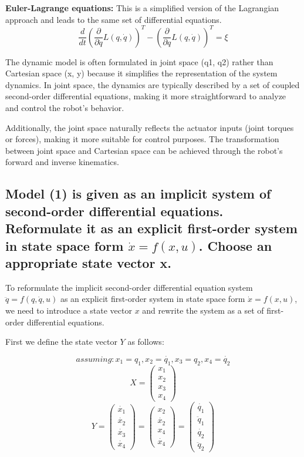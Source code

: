 \documentclass[a4paper, 12pt]{report}
\begin{document}
\textbf{Euler-Lagrange equations:} This is a simplified version of the Lagrangian approach and leads to the same set of differential equations.
$$\frac{d}{dt}\left(\frac{\partial}{\partial \dot{q}} L(q, \dot{q})\right)^T-\left(\frac{\partial}{\partial q} L(q, \dot{q})\right)^T=\xi$$

The dynamic model is often formulated in joint space (q1, q2) rather than Cartesian space (x, y) because it simplifies the representation of the system dynamics. In joint space, the dynamics are typically described by a set of coupled second-order differential equations, making it more straightforward to analyze and control the robot's behavior. 
\medskip

Additionally, the joint space naturally reflects the actuator inputs (joint torques or forces), making it more suitable for control purposes. The transformation between joint space and Cartesian space can be achieved through the robot's forward and inverse kinematics.
\medskip


\subsection{Model (1) is given as an implicit system of second-order differential equations. Reformulate it as an explicit first-order system in state space form $\dot{x} = f(x,u)$. Choose an appropriate state vector x.}

To reformulate the implicit second-order differential equation system \( \ddot{q} = f(q, \dot{q}, u) \) as an explicit first-order system in state space form \( \dot{x} = f(x, u) \), we need to introduce a state vector \( x \) and rewrite the system as a set of first-order differential equations.

First we define the state vector \(Y\) as follows:

$$assuming: x_1 = q_1, x_2 = \dot{q_1}, x_3 = q_2, x_4 = \dot{q_2}$$
\[ X  = \begin{pmatrix} x_1 \\ x_2 \\ x_3 \\ x_4 \end{pmatrix} \]
\[ Y  = \begin{pmatrix} \dot{x_1} \\ \dot{x_2} \\ \dot{x_3} \\ \dot{x_4} \end{pmatrix} = \begin{pmatrix} x_2 \\ \dot{x_2} \\ x_4 \\ \dot{x_4} \end{pmatrix} = \begin{pmatrix} \dot{q_1} \\ \ddot{q}_1 \\ \dot{q_2} \\ \ddot{q}_2 \end{pmatrix}\]
\end{document}
